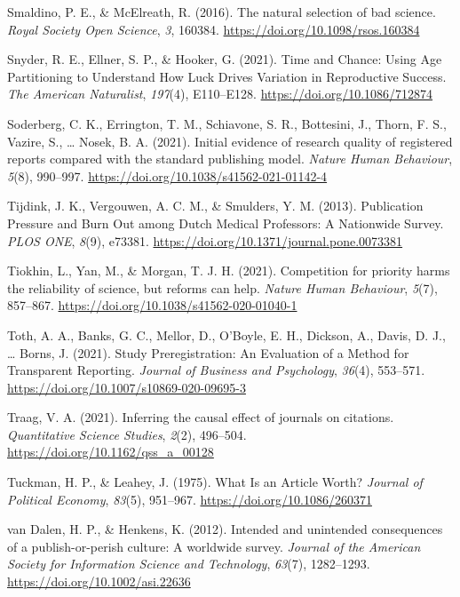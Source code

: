\documentclass[
  british,
  a4paper,
  ,man,mask,floatsintext]{apa6}
\newlength{\cslhangindent}
\newenvironment{CSLReferences}[2] %
 {\begin{list}{}{%
  \setlength{\itemindent}{0pt}
  \setlength{\leftmargin}{0pt}
  \setlength{\parsep}{0pt}
  \ifodd #1
   \setlength{\leftmargin}{\cslhangindent}
   \setlength{\itemindent}{-1\cslhangindent}
  \fi
  \setlength{\itemsep}{#2\baselineskip}}}
 {\end{list}}
\begin{document}
\begin{CSLReferences}{1}{0}
Smaldino, P. E., \& McElreath, R. (2016). The natural selection of bad science. \emph{Royal Society Open Science}, \emph{3}, 160384. \url{https://doi.org/10.1098/rsos.160384}

Snyder, R. E., Ellner, S. P., \& Hooker, G. (2021). Time and {Chance}: {Using Age Partitioning} to {Understand How Luck Drives Variation} in {Reproductive Success}. \emph{The American Naturalist}, \emph{197}(4), E110--E128. \url{https://doi.org/10.1086/712874}

Soderberg, C. K., Errington, T. M., Schiavone, S. R., Bottesini, J., Thorn, F. S., Vazire, S., \ldots{} Nosek, B. A. (2021). Initial evidence of research quality of registered reports compared with the standard publishing model. \emph{Nature Human Behaviour}, \emph{5}(8), 990--997. \url{https://doi.org/10.1038/s41562-021-01142-4}

Tijdink, J. K., Vergouwen, A. C. M., \& Smulders, Y. M. (2013). Publication {Pressure} and {Burn Out} among {Dutch Medical Professors}: {A Nationwide Survey}. \emph{PLOS ONE}, \emph{8}(9), e73381. \url{https://doi.org/10.1371/journal.pone.0073381}

Tiokhin, L., Yan, M., \& Morgan, T. J. H. (2021). Competition for priority harms the reliability of science, but reforms can help. \emph{Nature Human Behaviour}, \emph{5}(7), 857--867. \url{https://doi.org/10.1038/s41562-020-01040-1}

Toth, A. A., Banks, G. C., Mellor, D., O'Boyle, E. H., Dickson, A., Davis, D. J., \ldots{} Borns, J. (2021). Study {Preregistration}: {An Evaluation} of a {Method} for {Transparent Reporting}. \emph{Journal of Business and Psychology}, \emph{36}(4), 553--571. \url{https://doi.org/10.1007/s10869-020-09695-3}

Traag, V. A. (2021). Inferring the causal effect of journals on citations. \emph{Quantitative Science Studies}, \emph{2}(2), 496--504. \url{https://doi.org/10.1162/qss_a_00128}

Tuckman, H. P., \& Leahey, J. (1975). What {Is} an {Article Worth}? \emph{Journal of Political Economy}, \emph{83}(5), 951--967. \url{https://doi.org/10.1086/260371}

van Dalen, H. P., \& Henkens, K. (2012). Intended and unintended consequences of a publish-or-perish culture: {A} worldwide survey. \emph{Journal of the American Society for Information Science and Technology}, \emph{63}(7), 1282--1293. \url{https://doi.org/10.1002/asi.22636}


\end{CSLReferences}
\end{document}
